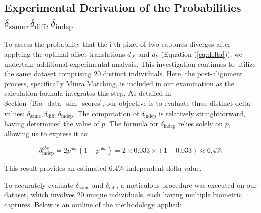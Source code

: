 \newpage
\subsection{Experimental Derivation of the Probabilities \(\delta_{\text{same}}, \delta_{\text{diff}}, \delta_{\text{indep}}\)}
\label{sec:delta}

To assess the probability that the i-th pixel of two captures diverges after applying the optimal offset translations \( d_X \) and \( d_Y \) (Equation (\ref{eq:delta})), we undertake additional experimental analysis. This investigation continues to utilize the same dataset comprising 20 distinct individuals. Here, the post-alignment process, specifically Miura Matching, is included in our examination as the calculation formula integrates this step. As detailed in Section~\ref{Bio_data_sim_scores}, our objective is to evaluate three distinct delta values: \(\delta_{\text{same}}, \delta_{\text{diff}}, \delta_{\text{indep}}\). The computation of \( \delta_{\text{indep}} \) is relatively straightforward, having determined the value of \( p \). The formula for \( \delta_{\text{indep}} \) relies solely on \( p \), allowing us to express it as:

\[ \delta_{\text{indep}}^{obs} = 2p^{obs}(1 - p^{obs}) = 2 \times 0.033 \times (1 - 0.033) \approx 6.4\% \]

This result provides an estimated \(6.4\)\% independent delta value.

To accurately evaluate \( \delta_{\text{same}} \) and \( \delta_{\text{diff}} \), a meticulous procedure was executed on our dataset, which involves 20 unique individuals, each having multiple biometric captures. Below is an outline of the methodology applied:

